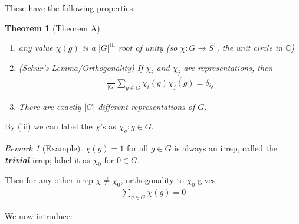 \documentclass[]{article}
\theoremstyle{custhm}
\theoremstyle{cusdef}
\theoremstyle{custhm}
\theoremstyle{custhm}
\theoremstyle{custhm}
\theoremstyle{custhm}
\newtheorem*{theorem*}{Theorem}
\theoremstyle{cusdef}
\theoremstyle{remark}
\newtheorem*{remark*}{Remark}
\newcommand{\C}{\mathbb{C}}
\newcommand{\ra}{\rightarrow}
\newcommand{\undf}[1]{\textit{\textbf{#1}}}
\begin{document}
These have the following properties:

\begin{theorem*}[Theorem A]\ 
\begin{enumerate}[label=(\roman*)]
	\item any value $\chi(g)$ is a $|G|^{\textrm{th}}$ root of unity (so $\chi : G\ra S^1$, the unit circle in $\C$)
	\item (Schur's Lemma/Orthogonality) If $\chi_i$ and $\chi_j$ are representations, then
	\begin{align*}
		\frac{1}{|G|} \sum_{g\in G} \chi_i(g)\overline{\chi_j(g)} = \delta_{ij}
	\end{align*}
	\item There are exactly $|G|$ different representations of $G$.
\end{enumerate}
\end{theorem*}

By (iii) we can label the $\chi$'s as $\chi_g: g\in G$.

\begin{remark*}[Example]
$\chi(g) = 1$ for all $g\in G$ is always an irrep, called the \undf{trivial} irrep; label it as $\chi_0$ for $0\in G$.

Then for any other irrep $\chi\ne \chi_0$, orthogonality to $\chi_0$ gives
\begin{align*}
	\sum_{g\in G}\chi(g) = 0
\end{align*}
\end{remark*}

We now introduce:
\end{document}
